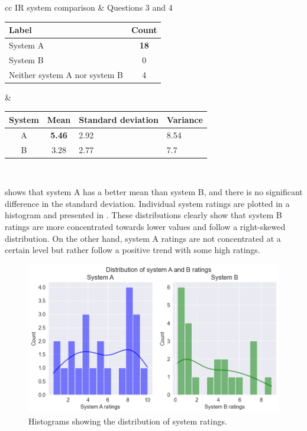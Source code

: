 \begin{center}
	\label{tab:question_2_results}
	\begin{tabular}{ cc }   %
		IR system comparison  & Questions 3 and 4 \\  
\begin{tabularx}{.4\textwidth}{|Y|c|}
	\hline
	Label & Count \\
	\hline
	System A & \textbf{18} \\
	\hline
	System B & 0 \\
	\hline
	Neither system A nor system B & 4 \\
	\hline
	
\end{tabularx} &  %
		\begin{tabularx}{.45\textwidth}{|c|c|Y|Y|}
			\hline
			System & Mean & Standard deviation & Variance \\
			\hline
			 A & \textbf{5.46} & 2.92  & 8.54 \\
			\hline
			 B & 3.28 & 2.77 & 7.7 \\
			\hline

		\end{tabularx} \\
	\end{tabular}
\end{center}

 shows that system A has a better mean than system B, and there is no significant difference in the standard deviation. Individual system ratings are plotted in a histogram and presented in . These distributions clearly show that system B ratings are more concentrated towards lower values and follow a right-skewed distribution. On the other hand, system A ratings are not concentrated at a certain level but rather follow a positive trend with some high ratings.

\begin{figure}[h]
	\centering
	\includegraphics[width=.99\textwidth]{images/subplots/rating_histograms.png}
	\caption{Histograms showing the distribution of system ratings.  \label{fig:histograms}}
\end{figure}



